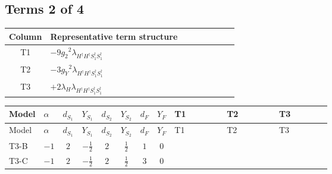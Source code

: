 \documentclass[8pt]{article}
\begin{document}
\begin{landscape}
\subsection*{Terms 2 of 4}
\begin{center}
\begin{tabular}{@{}c >{\raggedright\arraybackslash}p{0.82\linewidth}@{}}
\toprule
Column & Representative term structure \\
\midrule
T1 & \(\displaystyle -9 {g_2}^2 {\lambda_{H^\dagger H^\dagger S_1^\dagger S_1^\dagger}}\) \\
\midrule
T2 & \(\displaystyle -3 {g_Y}^2 {\lambda_{H^\dagger H^\dagger S_1^\dagger S_1^\dagger}}\) \\
\midrule
T3 & \(\displaystyle +2 {\lambda_H} {\lambda_{H^\dagger H^\dagger S_1^\dagger S_1^\dagger}}\) \\
\midrule
\bottomrule
\end{tabular}
\end{center}
\smallskip
\tiny
\begin{longtable}{@{}llcccccc >{\raggedright\arraybackslash}p{0.21\linewidth} >{\raggedright\arraybackslash}p{0.21\linewidth} >{\raggedright\arraybackslash}p{0.21\linewidth}@{}}
\toprule
Model & $\alpha$ & $d_{S_1}$ & $Y_{S_1}$ & $d_{S_2}$ & $Y_{S_2}$ & $d_F$ & $Y_F$ & T1 & T2 & T3 \\
\midrule
\endfirsthead
\toprule
Model & $\alpha$ & $d_{S_1}$ & $Y_{S_1}$ & $d_{S_2}$ & $Y_{S_2}$ & $d_F$ & $Y_F$ & T1 & T2 & T3 \\
\midrule
\endhead
T3-B & $-1$ & $2$ & $-\frac{1}{2}$ & $2$ & $\frac{1}{2}$ & $1$ & $0$ & \scriptsize\adjustbox{max width=\linewidth}{$\begin{gathered} -9 {g_2}^2 {\lambda_{H^\dagger H^\dagger S_1^\dagger S_1^\dagger}}\end{gathered}$} & \scriptsize\adjustbox{max width=\linewidth}{$\begin{gathered} -3 {g_Y}^2 {\lambda_{H^\dagger H^\dagger S_1^\dagger S_1^\dagger}}\end{gathered}$} & \scriptsize\adjustbox{max width=\linewidth}{$\begin{gathered} +2 {\lambda_H} {\lambda_{H^\dagger H^\dagger S_1^\dagger S_1^\dagger}}\end{gathered}$} \\
\midrule
T3-C & $-1$ & $2$ & $-\frac{1}{2}$ & $2$ & $\frac{1}{2}$ & $3$ & $0$ & \scriptsize\adjustbox{max width=\linewidth}{$\begin{gathered} -9 {g_2}^2 {\lambda_{H^\dagger H^\dagger S_1^\dagger S_1^\dagger}}\end{gathered}$} & \scriptsize\adjustbox{max width=\linewidth}{$\begin{gathered} -3 {g_Y}^2 {\lambda_{H^\dagger H^\dagger S_1^\dagger S_1^\dagger}}\end{gathered}$} & \scriptsize\adjustbox{max width=\linewidth}{$\begin{gathered} +2 {\lambda_H} {\lambda_{H^\dagger H^\dagger S_1^\dagger S_1^\dagger}}\end{gathered}$} \\

\end{longtable}
\end{landscape}
\end{document}
